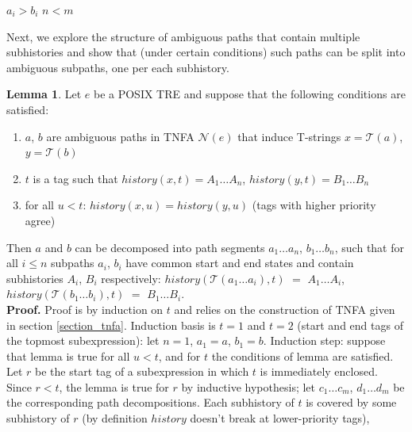 \documentclass{article}
\newcommand{\Xeq}{\!=\!}
\newcommand{\XN}{\mathcal{N}}
\newcommand{\XT}{\mathcal{T}}
\theoremstyle{definition}
\newtheorem{XLem}{Lemma}
\begin{document}
\begin{multicols}{2}
    \begin{algorithm}[H] \DontPrintSemicolon {} 
     {
        \For {$i \Xeq \overline{1, min(n, m)}$} {
             {\Return $a_i \!>\! b_i$}
        }
        \Return $n \!<\! m$ \;
    }
    \end{algorithm}

Next, we explore the structure of ambiguous paths that contain multiple subhistories
and show that (under certain conditions) such paths can be split into ambiguous subpaths,
one per each subhistory.

\begin{XLem}\label{lemma_path_decomposition}
Let $e$ be a POSIX TRE and suppose that the following conditions are satisfied:
\begin{enumerate}
    \item $a$, $b$ are ambiguous paths in TNFA $\XN(e)$ that induce T-strings $x \Xeq \XT(a)$, $y \Xeq \XT(b)$
    \item $t$ is a tag such that $history(x, t) \Xeq A_1 \dots A_n$, $history(y, t) \Xeq B_1 \dots B_n$
    \item for all $u \!<\! t$: $history(x, u) \Xeq history(y, u)$
        (tags with higher priority agree)
\end{enumerate}
Then $a$ and $b$ can be decomposed into path segments $a_1 \dots a_n$, $b_1 \dots b_n$,
such that for all $i \!\leq\! n$ subpaths $a_i$, $b_i$ have common start and end states and
contain subhistories $A_i$, $B_i$ respectively:
$history(\XT(a_1 \dots a_i), t)$ $\Xeq$ $A_1 \dots A_i$,
$history(\XT(b_1 \dots b_i), t)$ $\Xeq$ $B_1 \dots B_i$.
\\[0.5em]
\textbf{Proof.}
Proof is by induction on $t$ and relies on the construction of TNFA given in section \ref{section_tnfa}.
Induction basis is $t \Xeq 1$ and $t \Xeq 2$ (start and end tags of the topmost subexpression): let $n \Xeq 1$, $a_1 \Xeq a$, $b_1 \Xeq b$.
Induction step: suppose that lemma is true for all $u \!<\! t$,
and for $t$ the conditions of lemma are satisfied.
Let $r$ be the start tag of a subexpression in which $t$ is immediately enclosed.
Since $r \!<\! t$, the lemma is true for $r$ by inductive hypothesis;
let $c_1 \dots c_m$, $d_1 \dots d_m$ be the corresponding path decompositions.
Each subhistory of $t$ is covered by some subhistory of $r$ (by definition $history$ doesn't break at lower-priority tags),

\end{XLem}
\end{multicols}
\end{document}
